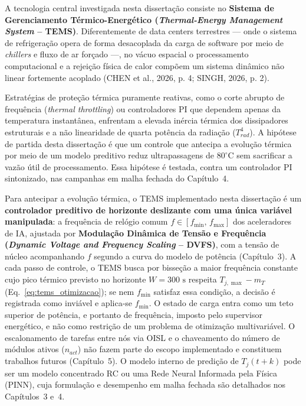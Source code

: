 A tecnologia central investigada nesta dissertação consiste no \textbf{Sistema de Gerenciamento Térmico-Energético (\textit{Thermal-Energy Management System} -- TEMS)}. Diferentemente de data centers terrestres — onde o sistema de refrigeração opera de forma desacoplada da carga de software por meio de \textit{chillers} e fluxo de ar forçado —, no vácuo espacial o processamento computacional e a rejeição física de calor compõem um sistema dinâmico não linear fortemente acoplado (CHEN et al., 2026, p. 4; SINGH, 2026, p. 2).

Estratégias de proteção térmica puramente reativas, como o corte abrupto de frequência (\textit{thermal throttling}) ou controladores PI que dependem apenas da temperatura instantânea, enfrentam a elevada inércia térmica dos dissipadores estruturais e a não linearidade de quarta potência da radiação ($T_{rad}^4$). A hipótese de partida desta dissertação é que um controle que antecipa a evolução térmica por meio de um modelo preditivo reduz ultrapassagens de $80^\circ\text{C}$ sem sacrificar a vazão útil de processamento. Essa hipótese é testada, contra um controlador PI sintonizado, nas campanhas em malha fechada do Capítulo~4.

Para antecipar a evolução térmica, o TEMS implementado nesta dissertação é um \textbf{controlador preditivo de horizonte deslizante com uma única variável manipulada}: a frequência de relógio comum $f \in [f_{\min},\, f_{\max}]$ dos aceleradores de IA, ajustada por \textbf{Modulação Dinâmica de Tensão e Frequência (\textit{Dynamic Voltage and Frequency Scaling} -- DVFS)}, com a tensão de núcleo acompanhando $f$ segundo a curva do modelo de potência (Capítulo~3). A cada passo de controle, o TEMS busca por bisseção a maior frequência constante cujo pico térmico previsto no horizonte $W = 300\text{ s}$ respeita $T_{j,\max} - m_T$ (Eq.~\ref{eq:tems_otimizacao}); se nem $f_{\min}$ satisfaz essa condição, a decisão é registrada como inviável e aplica-se $f_{\min}$. O estado de carga entra como um teto superior de potência, e portanto de frequência, imposto pelo supervisor energético, e não como restrição de um problema de otimização multivariável. O escalonamento de tarefas entre nós via OISL e o chaveamento do número de módulos ativos ($n_{act}$) não fazem parte do escopo implementado e constituem trabalhos futuros (Capítulo~5). O modelo interno de predição de $T_j(t+k)$ pode ser um modelo concentrado RC ou uma Rede Neural Informada pela Física (PINN), cuja formulação e desempenho em malha fechada são detalhados nos Capítulos~3 e~4.

